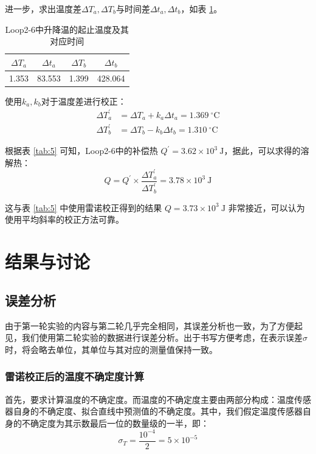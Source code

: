 \documentclass[cn,hazy,pku,12pt,normal,math=newtx,cite=super]{elegantnote}
\begin{document}
进一步，求出温度差$\Delta T_a,\Delta T_b$与时间差$\Delta t_a,\Delta t_b$，如表 \ref{tab:9a}。
\begin{table}[htbp]
    \centering
    \caption{Loop2-6中升降温的起止温度及其对应时间}
    \begin{tabular}{cccc}
        \toprule
         $\Delta T_a$ & $\Delta t_a$ & $\Delta T_b$ & $\Delta t_b$ \\
         \midrule
         1.353 & 83.553 & 1.399 & 428.064 \\
         \bottomrule         
    \end{tabular}
    \label{tab:9a}
\end{table}

使用$k_a,k_b$对于温度差进行校正：
\begin{align*}
    \Delta T_a^\prime &= \Delta T_a + k_a\Delta t_a = 1.369 \mathrm{~{}^\circ C}\\
    \Delta T_b^\prime &= \Delta T_b - k_b\Delta t_b = 1.310 \mathrm{~{}^\circ C}
\end{align*}

根据表 \ref{tab:5} 可知，Loop2-6中的补偿热 $Q^\prime = 3.62\times 10^{3} \mathrm{~J}$，据此，可以求得的溶解热：
\begin{equation*}
    Q = Q^\prime \times \frac{\Delta T_a^\prime}{\Delta T_b^\prime} = 3.78 \times 10^{3} \mathrm{~J}
\end{equation*}

这与表 \ref{tab:5} 中使用雷诺校正得到的结果 $Q = 3.73 \times 10^{3} \mathrm{~J}$ 非常接近，可以认为使用平均斜率的校正方法可靠。

\section{结果与讨论}
\subsection{误差分析}

由于第一轮实验的内容与第二轮几乎完全相同，其误差分析也一致，为了方便起见，我们使用第二轮实验的数据进行误差分析。出于书写方便考虑，在表示误差$\sigma$时，将会略去单位，其单位与其对应的测量值保持一致。

\subsubsection{雷诺校正后的温度不确定度计算}

首先，要求计算温度的不确定度。而温度的不确定度主要由两部分构成：温度传感器自身的不确定度、拟合直线中预测值的不确定度。其中，我们假定温度传感器自身的不确定度为其示数最后一位的数量级的一半，即：
\begin{equation}\label{eq:3}
    \sigma_{T} = \frac{10^{-4}}{2} = 5\times10^{-5}
\end{equation}
\end{document}
